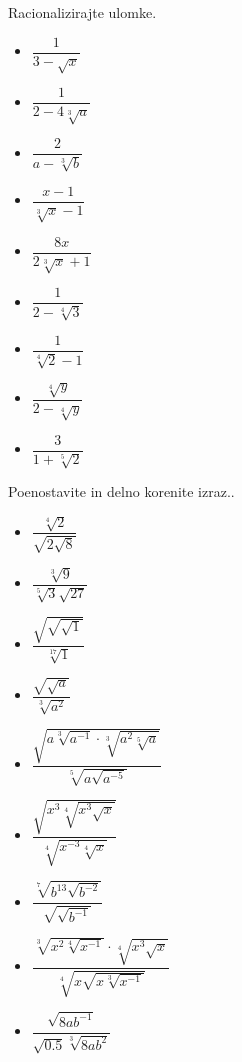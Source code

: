         
            \begin{naloga}
                Racionalizirajte ulomke.
                \begin{itemize}
                    \item $\displaystyle \dfrac{1}{3-\sqrt{x}}$ 
                    \item $\displaystyle \dfrac{1}{2-4\sqrt[3]{a}}$ 
                    \item $\displaystyle \dfrac{2}{a-\sqrt[3]{b}}$ 
                    \item $\displaystyle \dfrac{x-1}{\sqrt[3]{x}-1}$ 
                    \item $\displaystyle \dfrac{8x}{2\sqrt[3]{x}+1}$ 
                    \item $\displaystyle \dfrac{1}{2-\sqrt[4]{3}}$ 
                    \item $\displaystyle \dfrac{1}{\sqrt[4]{2}-1}$ 
                    \item $\displaystyle \dfrac{\sqrt[4]{y}}{2-\sqrt[4]{y}}$ 
                    \item $\displaystyle \dfrac{3}{1+\sqrt[5]{2}}$ 
                \end{itemize}
            \end{naloga}
        


        
            \begin{naloga}
                Poenostavite in delno korenite izraz..
                \begin{itemize}
                    \item $\displaystyle \dfrac{\sqrt[4]{2}}{\sqrt{2\sqrt{8}}}$ 
                    \item $\displaystyle \dfrac{\sqrt[3]{9}}{\sqrt[5]{3}\sqrt{27}}$ 
                    \item $\displaystyle \dfrac{\sqrt{\sqrt{\sqrt{1}}}}{\sqrt[17]{1}}$ 
                    \item $\displaystyle \dfrac{\sqrt{\sqrt{a}}}{\sqrt[3]{a^2}}$ 
                    \item $\displaystyle \dfrac{\sqrt{a\sqrt[3]{a^{-1}}\cdot\sqrt[3]{a^2\sqrt[5]{a}}}}{\sqrt[5]{a\sqrt{a^{-5}}}}$ 
                    \item $\displaystyle \dfrac{\sqrt{x^3\sqrt[4]{x^3\sqrt{x}}}}{\sqrt[4]{x^{-3}\sqrt[4]{x}}}$ 
                    \item $\displaystyle \dfrac{\sqrt[7]{b^{13}\sqrt{b^{-2}}}}{\sqrt{\sqrt{b^{-1}}}}$ 
                    \item $\displaystyle \dfrac{\sqrt[3]{x^2\sqrt[4]{x^{-1}}}\cdot\sqrt[4]{x^3\sqrt{x}}}{\sqrt[4]{x\sqrt{x\sqrt[3]{x^{-1}}}}}$ 
                    \item $\displaystyle \dfrac{\sqrt{8ab^{-1}}}{\sqrt{0.5}\sqrt[3]{8ab^2}}$ 
                \end{itemize}
            \end{naloga}
        



